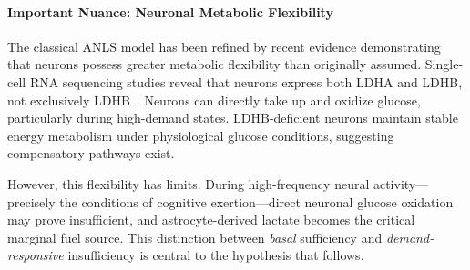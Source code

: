 \paragraph{Important Nuance: Neuronal Metabolic Flexibility}

The classical ANLS model has been refined by recent evidence demonstrating that neurons possess greater metabolic flexibility than originally assumed. Single-cell RNA sequencing studies reveal that neurons express both LDHA and LDHB, not exclusively LDHB~\cite{Kim2025ANLS}. Neurons can directly take up and oxidize glucose, particularly during high-demand states. LDHB-deficient neurons maintain stable energy metabolism under physiological glucose conditions, suggesting compensatory pathways exist.

However, this flexibility has limits. During high-frequency neural activity---precisely the conditions of cognitive exertion---direct neuronal glucose oxidation may prove insufficient, and astrocyte-derived lactate becomes the critical marginal fuel source. This distinction between \emph{basal} sufficiency and \emph{demand-responsive} insufficiency is central to the hypothesis that follows.

